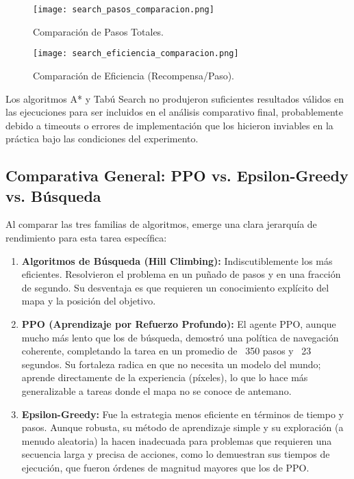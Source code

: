 \documentclass[12pt, oneside, openany]{book}
\begin{document}
\begin{figure}[H]
        \texttt{[image: search\_pasos\_comparacion.png]}
        \caption{Comparación de Pasos Totales.}
        \label{fig:search_pasos}
\end{figure}
\begin{figure}[H]
        \texttt{[image: search\_eficiencia\_comparacion.png]}
        \caption{Comparación de Eficiencia (Recompensa/Paso).}
        \label{fig:search_eficiencia}
\end{figure}

Los algoritmos A* y Tabú Search no produjeron suficientes resultados válidos en las ejecuciones para ser incluidos en el análisis comparativo final, probablemente debido a timeouts o errores de implementación que los hicieron inviables en la práctica bajo las condiciones del experimento.

\subsection{Comparativa General: PPO vs. Epsilon-Greedy vs. Búsqueda}
Al comparar las tres familias de algoritmos, emerge una clara jerarquía de rendimiento para esta tarea específica:
\begin{enumerate}
    \item \textbf{Algoritmos de Búsqueda (Hill Climbing):} Indiscutiblemente los más eficientes. Resolvieron el problema en un puñado de pasos y en una fracción de segundo. Su desventaja es que requieren un conocimiento explícito del mapa y la posición del objetivo.
    \item \textbf{PPO (Aprendizaje por Refuerzo Profundo):} El agente PPO, aunque mucho más lento que los de búsqueda, demostró una política de navegación coherente, completando la tarea en un promedio de ~350 pasos y ~23 segundos. Su fortaleza radica en que no necesita un modelo del mundo; aprende directamente de la experiencia (píxeles), lo que lo hace más generalizable a tareas donde el mapa no se conoce de antemano.
    \item \textbf{Epsilon-Greedy:} Fue la estrategia menos eficiente en términos de tiempo y pasos. Aunque robusta, su método de aprendizaje simple y su exploración (a menudo aleatoria) la hacen inadecuada para problemas que requieren una secuencia larga y precisa de acciones, como lo demuestran sus tiempos de ejecución, que fueron órdenes de magnitud mayores que los de PPO.
\end{enumerate}
\end{document}
